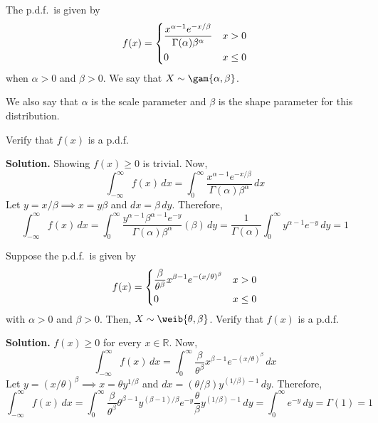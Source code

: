 \begin{Example}{}{}
    The p.d.f.\ is given by
    \[ f(x)=\begin{dcases}
            \frac{x^{\alpha-1}e^{-x/\beta}}{\Gamma(\alpha)\beta^\alpha} & x>0    \\
            0                                                           & x\le 0
        \end{dcases}
    \]
    when $ \alpha>0 $ and $ \beta>0 $. We say that $ X \sim \gam{\alpha,\beta} $.

    We also say that $ \alpha $ is the scale parameter and $ \beta $ is the shape parameter
    for this distribution.

    Verify that $ f(x) $ is a p.d.f.

    \textbf{Solution.} Showing $ f(x)\ge 0 $ is trivial. Now,
    \[ \int_{-\infty}^{\infty} f(x)\, d{x} =
        \int_{0}^{\infty} \frac{x^{\alpha-1}e^{-x/\beta}}{\Gamma(\alpha)
        \beta^{\alpha}} \, d{x}  \]
    Let $ y=x/\beta\implies x=y\beta $ and $ dx=\beta\,dy $.
    Therefore,
    \[\int_{-\infty}^{\infty} f(x)\, d{x} =\int_{0}^{\infty}
        \frac{y^{\alpha-1}\beta^{\alpha-1}e^{-y}}{\Gamma(\alpha)\beta^\alpha}(\beta)  \, d{y}
        =\frac{1}{\Gamma(\alpha)}\int_{0}^{\infty} y^{\alpha-1}e^{-y}\, d{y}=1    \]
\end{Example}

\begin{Example}{}{}
    Suppose the p.d.f.\ is given by
    \[ f(x)=\begin{dcases}
            \frac{\beta}{\theta^\beta}x^{\beta-1}e^{-\left( x/\theta  \right)^\beta} & x>0    \\
            0                                                                        & x\le 0
        \end{dcases} \]
    with $ \alpha>0 $ and $ \beta>0 $.
    Then, $ X \sim \weib{\theta,\beta} $.
    Verify that $ f(x) $ is a p.d.f.

    \textbf{Solution.} $ f(x)\ge 0 $ for every $ x\in\mathbb{R} $. Now,
    \[ \int_{-\infty}^{\infty} f(x)\, d{x} =
        \int_{0}^{\infty} \frac{\beta}{\theta^\beta}x^{\beta-1}e^{-\left( x/\theta  \right)^\beta} \, d{x} \]
    Let $ y=(x/\theta)^\beta \implies
        x=\theta y^{1/\beta} $ and $ dx=(\theta/\beta) y^{(1/\beta)-1}\,dy $.
    Therefore,
    \[ \int_{-\infty}^{\infty} f(x)\, d{x}=\int_{0}^{\infty} \frac{\beta}{\theta^\beta} \theta^{\beta-1}
        y^{(\beta-1)/\beta}e^{-y}\frac{\theta}{\beta} y^{(1/\beta)-1}\, d{y}
        =\int_{0}^{\infty} e^{-y}\, d{y}=\Gamma(1)=1  \]
\end{Example}

